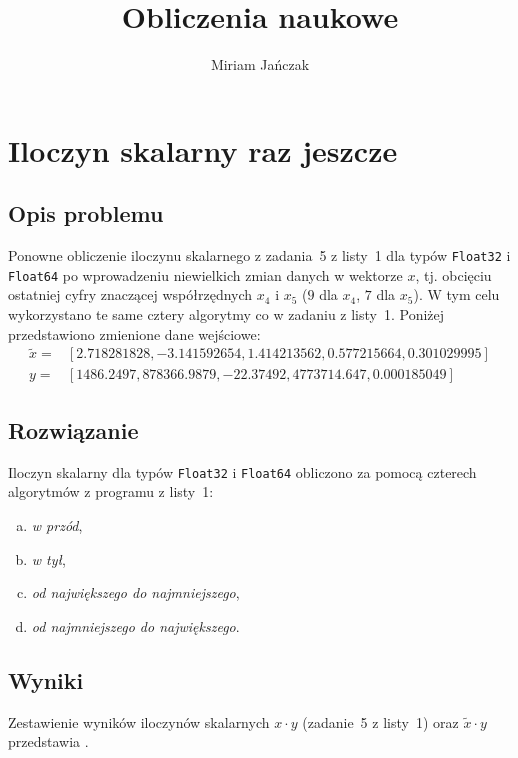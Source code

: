 \documentclass[11pt]{mk-polish-lab-report}
\author{Miriam Jańczak}
\title{Obliczenia naukowe}
\begin{document}
\maketitle

\section{Iloczyn skalarny raz jeszcze}

\subsection{Opis problemu}
Ponowne obliczenie iloczynu skalarnego z zadania~5 z listy~1 dla typów \texttt{Float32} i \texttt{Float64} po wprowadzeniu niewielkich zmian danych w wektorze $x$, tj. obcięciu ostatniej cyfry znaczącej współrzędnych $x_4$ i $x_5$ ($9$ dla $x_4$, $7$ dla $x_5$). W tym celu wykorzystano te same cztery algorytmy co w zadaniu z listy~1. Poniżej przedstawiono zmienione dane wejściowe:
\begin{align}
\tilde{x} = &[2.718281828, -3.141592654, 1.414213562, 0.577215664, 0.301029995] \nonumber \\
y = &[1486.2497, 878366.9879, -22.37492, 4773714.647, 0.000185049] \nonumber
\end{align}

\subsection{Rozwiązanie}
Iloczyn skalarny dla typów \texttt{Float32} i \texttt{Float64} obliczono za pomocą czterech algorytmów z programu z listy~1: 
\begin{enumerate}[(a)]
\item \textit{w przód},
\item \textit{w tył},  
\item \textit{od największego do najmniejszego},
\item \textit{od najmniejszego do największego}.
\end{enumerate}

\subsection{Wyniki}
Zestawienie wyników iloczynów skalarnych $x\cdot y$ (zadanie~5 z listy~1) oraz $\tilde{x}\cdot y$ przedstawia .
\end{document}
